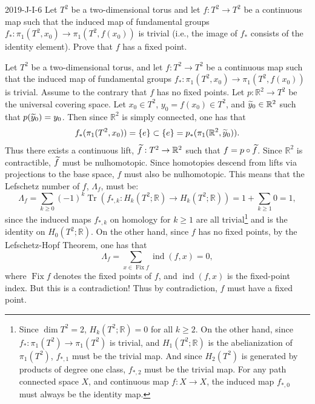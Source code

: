 \documentclass{article}
\begin{document}
	\begin{prb}{2019-J-I-6}
		Let $T^2$ be a two-dimensional torus and let $f: T^2 \to T^2$ be a continuous map such that the induced map of fundamental groups $f_\ast: \pi_{1}(T^2,x_0) \to \pi_1(T^2, f(x_0))$ is trivial (i.e., the image of $f_\ast$ consists of the identity element). Prove that $f$ has a fixed point. 
	\end{prb}
	Let $T^2$ be a two-dimensional torus,  and let $f: T^2 \to T^2$ be a continuous map such that the induced map of fundamental groups $f_{\ast}: \pi_{1}(T^2, x_0) \to \pi_{1}(T^2, f(x_0))$ is trivial. Assume to the contrary that $f$ has no fixed points. Let $p: \mathbb{R}^{2} \to T^{2}$ be the universal covering space. Let $x_{0} \in T^2$, $y_{0} = f(x_0) \in T^2$, and $\widetilde{y}_{0} \in \mathbb{R}^2$ such that $p(\widetilde{y}_{0}) = y_{0}$. Then since $\mathbb{R}^{2}$ is simply connected, one has that 
	\begin{equation*}
		f_{\ast}(\pi_{1}(T^2,x_{0}))  = \{e\} \subset \{e\} = p_{\ast}(\pi_1(\mathbb{R}^2, \widetilde{y}_0)). 
	\end{equation*}
	Thus there exists a continuous lift, $\widetilde{f}: T^2 \to \mathbb{R}^2$ such that $f = p \circ \widetilde{f}$. Since $\mathbb{R}^{2}$ is contractible, $\widetilde{f}$ must be nulhomotopic. Since homotopies descend from lifts via projections to the base space, $f$ must also be nulhomotopic. This means that the Lefschetz number of $f$, $\Lambda_{f}$, must be: 
	\begin{equation*}
		\Lambda_{f} = \sum_{k \geq 0}(-1)^{k}\operatorname{Tr}\left(f_{\ast,k}: H_{k}(T^{2}; \mathbb{R}) \to H_{k}(T^2; \mathbb{R})\right) = 1 + \sum_{k \geq 1}0 = 1, 
	\end{equation*}
	since the induced maps $f_{\ast,k}$ on homology for $k \geq 1$ are all trivial\footnote{Since $\dim{T^2} = 2$, $H_{k}(T^2; \mathbb{R}) = 0$ for all $k \geq 2$. On the other hand, since $f_{\ast}: \pi_1(T^2) \to \pi_1(T^2)$ is trivial, and $H_1(T^2;\mathbb{R})$ is the abelianization of $\pi_1(T^2)$, $f_{\ast,1}$ must be the trivial map. And since $H_{2}(T^2)$ is generated by products of degree one class, $f_{\ast,2}$ must be the trivial map. For any path connected space $X$, and continuous map $f: X \to X$, the induced map $f_{\ast,0}$ must always be the identity map.} and is the identity on $H_{0}(T^2; \mathbb{R})$. On the other hand, since $f$ has no fixed points, by the Lefschetz-Hopf Theorem, one has that 
	\begin{equation*}
		\Lambda_{f} = \sum_{x \in \operatorname{Fix}{f}}\operatorname{ind}(f,x) = 0, 
	\end{equation*}
	where $\operatorname{Fix}{f}$ denotes the fixed points of $f$, and $\operatorname{ind}(f, x)$ is the fixed-point index. But this is a contradiction! Thus by contradiction, $f$ must have a fixed point. 
	
\end{document}
